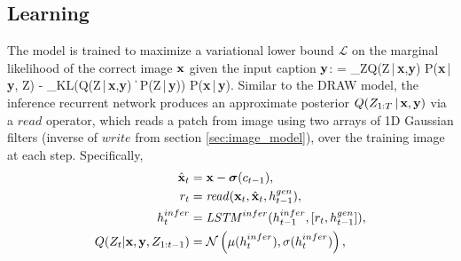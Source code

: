 \documentclass{article} %
\def\beqa#1\eeqa{\begin{eqnarray}#1\end{eqnarray}}
\newcommand{\given}{\,|\,}
\newcommand{\kldiv}{\mathrm{D}_{\rm KL}}
\newcommand{\klBars}{\,\|\,}
\newcommand{\sigmoid}{\boldsymbol{\sigma}}
\newcommand{\hdec}{h^{gen}}
\newcommand{\henc}{h^{infer}}
\newcommand{\readop}{\mathit{read}}
\newcommand{\writeop}{\mathit{write}}
\newcommand{\encoder}{\mathit{LSTM}^{infer}}
\newcommand{\canv}{c}
\newcommand{\Lat}{Z}
\newcommand{\icaption}{{\bf{y}}}
\newcommand{\oimage}{{\bf{x}}}
\newcommand{\post}{Q}
\newcommand{\prior}{P}
\newcommand{\loss}{\mathcal{L}}
\newcommand{\lloss}{\mathcal{L}^{z}}
\newcommand{\rloss}{\mathcal{L}^{x}}
\begin{document}
\subsection{Learning}
\vspace{-0.05in}
\label{sec:learning}
The model is trained to maximize a variational lower bound $\loss$ 
on the marginal likelihood of the correct image $\oimage$ given the input caption $\icaption$:
\beqa
\label{eq:varbound}
\loss = \sum_{\Lat}Q(\Lat\given\oimage,\icaption) \log P(\oimage\given\icaption, \Lat) - \kldiv\left(Q(\Lat\given\oimage,\icaption)\klBars 
  P(\Lat \given\icaption)\right) \le \log P(\oimage\given\icaption).
\eeqa
Similar to the DRAW model, the inference recurrent network 
produces an approximate posterior $Q(\Lat_{1:T}\given\oimage,\icaption)$ via a $\readop$ operator, which reads a patch from image using two arrays of 1D Gaussian filters (inverse of $\writeop$ from section \ref{sec:image_model}), over the training image at each step. Specifically, 
\begin{align}
\label{eq:x_hat}
\hat{\oimage}_t &= \oimage-\sigmoid(\canv_{t-1}),\\
\label{eq:read}
r_t &= \readop(\oimage_t, \hat{\oimage}_t, \hdec_{t-1}),\\
\henc_t &= \encoder(\henc_{t-1}, [r_t, \hdec_{t-1}]),\\
\post(\Lat_t|\oimage,\icaption,\Lat_{1:t-1}) &= \mathcal{N}\left(\mu(\henc_t), \sigma(\henc_t)\right),
\end{align}
\end{document}
